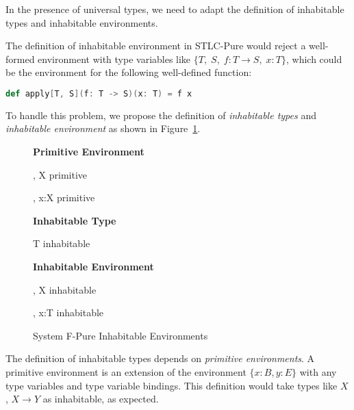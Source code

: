 In the presence of universal types, we need to adapt the definition of
inhabitable types and inhabitable environments.

The definition of inhabitable environment in STLC-Pure would reject a
well-formed environment with type variables like
$\{T, \; S, \; f: T \to S, \; x:T\}$, which could be the environment
for the following well-defined function:

\begin{lstlisting}[language=Scala]
  def apply[T, S](f: T -> S)(x: T) = f x
\end{lstlisting}

To handle this problem, we propose the definition of \emph{inhabitable
  types} and \emph{inhabitable environment} as shown in
Figure~\ref{fig:f-pure-inhabitability}.

\begin{figure}[h]
\begin{framed}

\setlength{\columnseprule}{0.4pt}
\begin{multicols}{2}

\textbf{Primitive Environment}


{ \Sigma ,\; X \quad primitive }

{ \Sigma ,\; x:X \quad primitive }

\textbf{Inhabitable Type}

{ T \quad inhabitable }

\columnbreak

\textbf{Inhabitable Environment}


{ \Gamma ,\; X \quad inhabitable }

{ \Gamma ,\; x:T \quad inhabitable }

\end{multicols}
\end{framed}

\caption{System F-Pure Inhabitable Environments }
\label{fig:f-pure-inhabitability}
\end{figure}

The definition of inhabitable types depends on \emph{primitive
  environments}. A primitive environment is an extension of the
environment $\{x:B, y:E\}$ with any type variables and type variable
bindings. This definition would take types like $X$, $X \to Y$ as
inhabitable, as expected.

